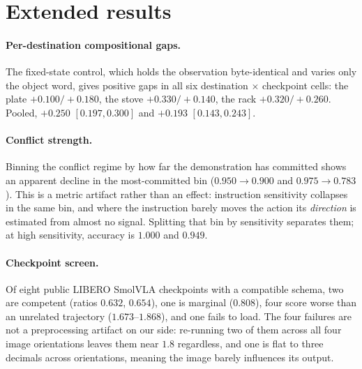 \documentclass{article}
\begin{document}
\section{Extended results}
\label{sec:extended}

\paragraph{Per-destination compositional gaps.} The fixed-state control, which holds the
observation byte-identical and varies only the object word, gives positive gaps in all six
destination $\times$ checkpoint cells: the plate $+0.100 / +0.180$, the stove $+0.330 / +0.140$,
the rack $+0.320 / +0.260$. Pooled, $+0.250$ $[0.197, 0.300]$ and $+0.193$ $[0.143, 0.243]$.

\paragraph{Conflict strength.} Binning the conflict regime by how far the demonstration has
committed shows an apparent decline in the most-committed bin ($0.950 \to 0.900$ and
$0.975 \to 0.783$). This is a metric artifact rather than an effect: instruction sensitivity
collapses in the same bin, and where the instruction barely moves the action its \emph{direction}
is estimated from almost no signal. Splitting that bin by sensitivity separates them; at high
sensitivity, accuracy is $1.000$ and $0.949$.

\paragraph{Checkpoint screen.} Of eight public LIBERO SmolVLA checkpoints with a compatible
schema, two are competent (ratios $0.632$, $0.654$), one is marginal ($0.808$), four score worse
than an unrelated trajectory ($1.673$--$1.868$), and one fails to load. The four failures are not
a preprocessing artifact on our side: re-running two of them across all four image orientations
leaves them near $1.8$ regardless, and one is flat to three decimals across orientations, meaning
the image barely influences its output.
\fi



\end{document}
